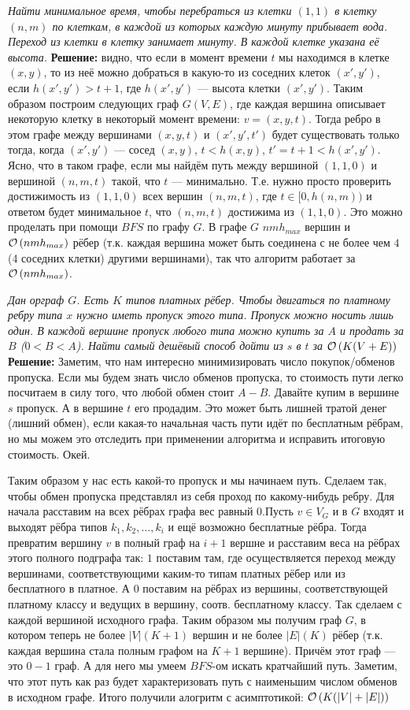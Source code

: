 \textit{Найти минимальное время, чтобы перебраться из клетки $(1,1)$ в клетку $(n,m)$ по клеткам, в каждой из
которых каждую минуту прибывает вода. Переход из клетки в клетку занимает минуту. В каждой клетке указана её высота.}
\textbf{Решение:} видно, что если в момент времени $t$ мы находимся в клетке $(x,y)$, то из неё можно добраться в какую-то
из соседних клеток $(x',y')$, если $h(x',y') > t+1$, где $h(x',y')$ --- высота клетки $(x',y')$. Таким образом построим
следующих граф $G(V,E)$, где каждая вершина описывает некоторую клетку в некоторый момент времени: $v = (x,y,t)$. Тогда
ребро в этом графе между вершинами $(x,y,t)$ и $(x',y',t')$ будет существовать только тогда, когда $(x',y')$ --- сосед 
$(x,y)$, $t < h(x,y)$, $t' = t + 1 < h(x',y')$. Ясно, что в таком графе, если мы найдём путь между вершиной $(1,1,0)$
и вершиной $(n,m,t)$ такой, что $t$ --- минимально. Т.е. нужно просто проверить достижимость из $(1,1,0)$ всех вершин 
$(n,m,t)$, где $t \in [0,h(n,m))$ и ответом будет минимальное $t$, что $(n,m,t)$ достижима из $(1,1,0)$. 
Это можно проделать при помощи $BFS$ по графу $G$. В графе $G$ $nmh_{max}$ вершин и $\mathcal{O}\left(nmh_{max}\right)$ рёбер (т.к. каждая
вершина может быть соединена с не более чем $4$ (4 соседних клетки) другими вершинами), так что
алгоритм работает за $\mathcal{O}\left(nmh_{max}\right)$. \xqed

\textit{Дан орграф $G$. Есть $K$ типов платных рёбер. Чтобы двигаться по платному ребру типа $x$ нужно иметь пропуск 
этого типа. Пропуск можно носить лишь один. В каждой вершине пропуск любого типа можно купить за $A$ и продать за $B$
($0<B<A$).
Найти самый дешёвый способ дойти из $s$ в $t$ за $\mathcal{O}\left(K(V+E)\right)$}
\textbf{Решение:} Заметим, что нам интересно минимизировать число покупок/обменов пропуска. Если мы будем знать число 
обменов пропуска, то стоимость пути легко посчитаем в силу того, что любой обмен стоит $A-B$. Давайте купим в вершине
$s$ пропуск. А в вершине $t$ его продадим. Это может быть лишней тратой денег (лишний обмен), если какая-то начальная часть пути идёт по бесплатным рёбрам, но мы можем это отследить при применении алгоритма и исправить итоговую стоимость. Окей.

Таким образом у нас есть какой-то пропуск и мы начинаем путь. Сделаем так, чтобы обмен пропуска представлял из себя проход
по какому-нибудь ребру. Для начала расставим на всех рёбрах графа вес равный $0$.Пусть $v \in V_G$ и в $G$ входят и 
выходят рёбра типов $k_1,k_2,\ldots,k_i$ и ещё возможно бесплатные рёбра. Тогда превратим вершину $v$ в полный граф 
на $i+1$ вершне и расставим веса на рёбрах этого полного подграфа так:
$1$ поставим там, где осуществляется переход между вершинами, соответствующими каким-то типам платных рёбер или из 
бесплатного в платное. А $0$ поставим на рёбрах из вершины, соответствующей платному классу и ведущих в вершину, соотв.
бесплатному классу. Так сделаем с каждой вершиной исходного графа. Таким образом мы получим граф $G$, в котором теперь
не более $|V|(K+1)$ вершин и не более $|E|(K)$ рёбер (т.к. каждая вершина стала полным графом на $K+1$ вершине). Причём
этот граф --- это $0-1$ граф. А для него мы умеем $BFS$-ом искать кратчайший путь. Заметим, что этот путь как раз будет
характеризовать путь с наименьшим числом обменов в исходном графе. Итого получили алогритм с асимптотикой: $\mathcal{O}\left(K(|V|+|E|)\right)$
\xqed
